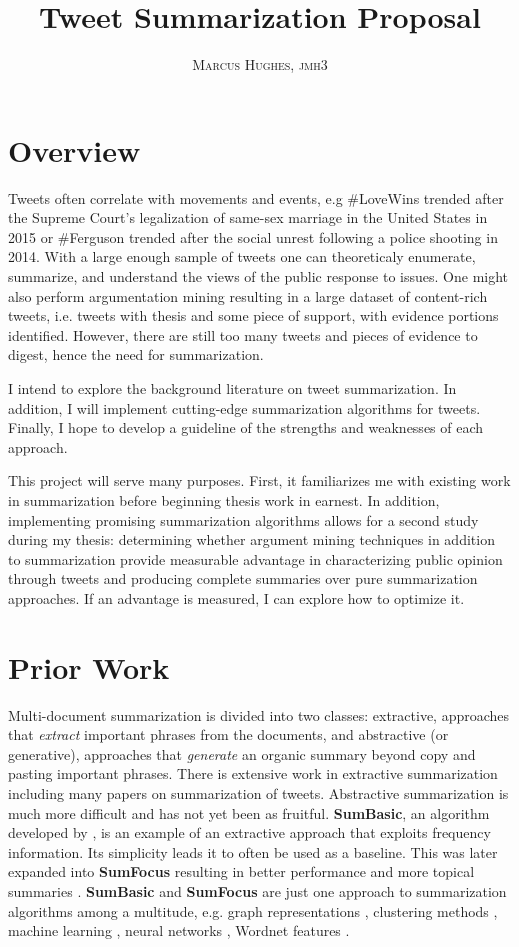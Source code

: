\documentclass[paper=letter, fontsize=12pt]{article}
\title{ \vspace{-15mm}\fontsize{24pt}{10pt}\selectfont\textbf{Tweet Summarization Proposal}\vspace{-5mm}} %
\author{\textsc{Marcus Hughes, jmh3 }\vspace{-10mm}}
\date{\vspace{-10mm}}
\begin{document}
\maketitle %
\thispagestyle{fancy} %

\begin{multicols}{2}
\section{Overview}
Tweets often correlate with movements and events, e.g \#LoveWins trended after the Supreme Court's legalization of same-sex marriage in the United States in 2015 or \#Ferguson trended after the social unrest following a police shooting in 2014. With a large enough sample of tweets one can theoreticaly enumerate, summarize, and understand the views of the public response to issues. One might also perform argumentation mining resulting in a large dataset of content-rich tweets, i.e. tweets with thesis and some piece of support, with evidence portions identified. However, there are still too many tweets and pieces of evidence to digest, hence the need for summarization.

I intend to explore the background literature on tweet summarization. In addition, I will implement cutting-edge summarization algorithms for tweets. Finally, I hope to develop a guideline of the strengths and weaknesses of each approach. 

This project will serve many purposes. First, it familiarizes me with existing work in summarization before beginning thesis work in earnest. In addition, implementing promising summarization algorithms allows for a second study during my thesis: determining whether argument mining techniques in addition to summarization provide measurable advantage in characterizing public opinion through tweets and producing complete summaries over pure summarization approaches. If an advantage is measured, I can explore how to optimize it.

\section{Prior Work}
Multi-document summarization is divided into two classes: extractive, approaches that \emph{extract} important phrases from the documents, and abstractive (or generative), approaches that \emph{generate} an organic summary beyond copy and pasting important phrases. There is extensive work in extractive summarization including many papers on summarization of tweets. Abstractive summarization is much more difficult and has not yet been as fruitful.  \textbf{SumBasic}, an algorithm developed by \cite{nv05}, is an example of an extractive approach that exploits frequency information. Its simplicity leads it to often be used as a baseline. This was later expanded into \textbf{SumFocus} resulting in better performance and more topical summaries \cite{vsbn07}. \textbf{SumBasic} and \textbf{SumFocus} are just one approach to summarization algorithms among a multitude, e.g. graph representations \cite{er04,pb07}, clustering methods \cite{kmeans}, machine learning \cite{Neto}, neural networks \cite{Padmapriya2014}, Wordnet features \cite{Pal2013}. 



\end{multicols}
\end{document}
